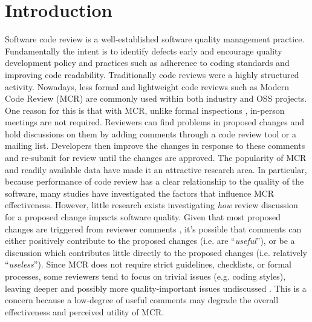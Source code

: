 
\section{Introduction}
Software code review is a well-established software quality management practice.
Fundamentally the intent is to identify defects early and encourage quality development policy and practices such as adherence to coding standards and improving code readability.
Traditionally code reviews were a highly structured activity. Nowadays, less formal and lightweight code reviews such as Modern Code Review (MCR)\cite{Bacchelli2013a} are commonly used within both industry and OSS projects. 
One reason for this is that with MCR, unlike formal inspections \cite{Fagan:1976:DCI:1661010.1661012}, in-person meetings are not required.
Reviewers can find problems in proposed changes and hold discussions on them by adding comments through a code review tool or a mailing list.
Developers then improve the changes in response to these comments and re-submit for review until the changes are approved.  
The popularity of MCR and readily available data have made it an attractive research area.  
In particular, because performance of code review has a clear relationship to the quality of the software, many studies have investigated the factors that influence MCR\cite{Baysal2001,Mcintosh,Beller,Hamasaki2013} effectiveness.
However, little research exists investigating \emph{how} review discussion for a proposed change impacts software quality.
Given that most proposed changes are triggered from reviewer comments \cite{Beller}, 
it's possible that comments can either positively contribute to the proposed changes (i.e. are ``\emph{useful}''), or be a discussion which contributes little directly to the proposed changes (i.e. relatively ``\emph{useless}''). 
Since MCR does not require strict guidelines, checklists, or formal processes, some reviewers tend to focus on trivial issues (e.g. coding styles), leaving deeper and possibly more quality-important issues undiscussed \cite{Bacchelli2013a}.
This is a concern because a low-degree of useful comments may degrade the overall effectiveness and perceived utility of MCR.

